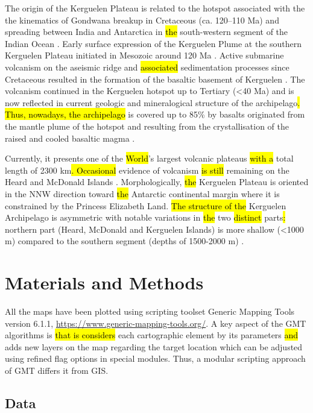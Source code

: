 \documentclass[geomatics,article,submit,pdftex,moreauthors]{Definitions/mdpi}
\begin{document}
The origin of the Kerguelen Plateau is related to the hotspot associated with the the kinematics of Gondwana breakup in Cretaceous (ca. 120--110 Ma) and spreading between India and Antarctica in \hl{the }south-western segment of the\hl{ }Indian Ocean \cite{Guglielmi}. Early surface expression of the Kerguelen Plume at the southern Kerguelen Plateau initiated in Mesozoic around 120 Ma \cite{Gaina}. Active submarine volcanism on the aseismic ridge and \hl{associated }sedimentation processes since Cretaceous resulted in the formation of the basaltic basement of Kerguelen \cite{Henry}. The volcanism continued in the Kerguelen hotspot up to Tertiary (<40 Ma) and is now reflected in current geologic and mineralogical structure of the archipelago\hl{. Thus, nowadays, the archipelago }is covered up to 85\% by basalts originated from the mantle plume of the hotspot and resulting from the crystallisation of the raised and cooled basaltic magma \cite{NICOLAYSEN2000313,Lacroix,Doucet}. 

Currently, it presents one of the \hl{World}'s largest\hl{ }volcanic plateaus \hl{with a} total length of 2300 km\hl{. Occasional} evidence of volcanism \hl{is still }remaining on the Heard and McDonald Islands\hl{ }\cite{Li}. Morphologically, \hl{the }Kerguelen Plateau is oriented in the NNW direction toward \hl{the }Antarctic continental margin where it is constrained by the Princess Elizabeth Land. \hl{The structure of the }Kerguelen Archipelago is asymmetric\hl{ }with notable variations in \hl{the }two \hl{distinct }parts\hl{: }northern part (Heard, McDonald and Kerguelen Islands) is more shallow (<1000 m) compared to the southern segment (depths of 1500-2000 m) \cite{Ramsay}. 

\section{Materials and Methods}

All the maps have been plotted using scripting toolset Generic Mapping Tools version 6.1.1, \href{https://www.generic-mapping-tools.org/}{https://www.generic-mapping-tools.org/}. A key aspect of the GMT algorithms is \hl{that is considers} each cartographic element\hl{ }by its parameters \hl{and }adds new layers on the map regarding the target location which can be adjusted using refined flag options in special modules. Thus, a modular scripting approach of GMT differs it from GIS. 

\subsection{Data}
\end{document}
